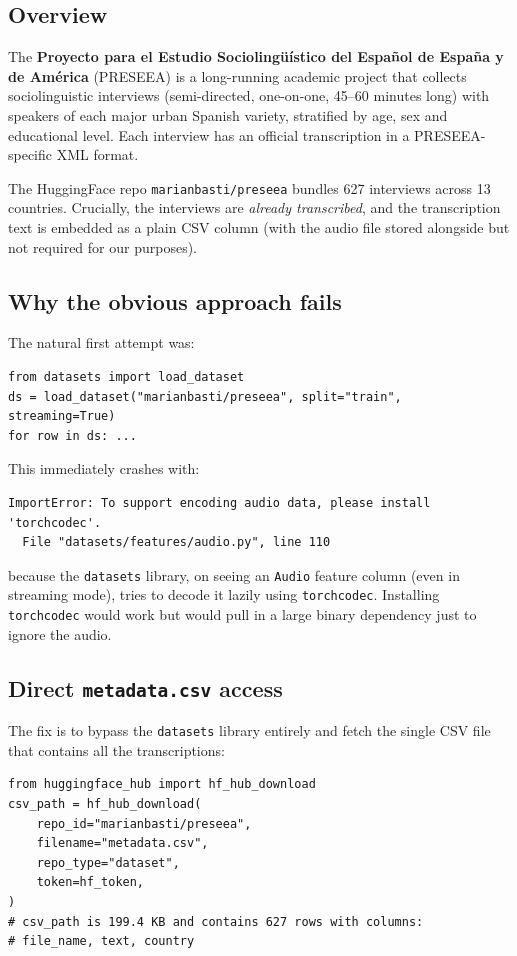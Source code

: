 \documentclass[11pt,a4paper]{article}
\begin{document}
\subsection{Overview}

The \textbf{Proyecto para el Estudio Sociolingüístico del Español de
España y de América} (PRESEEA) is a long-running academic project that
collects sociolinguistic interviews (semi-directed, one-on-one, 45--60
minutes long) with speakers of each major urban Spanish variety, stratified
by age, sex and educational level. Each interview has an official
transcription in a PRESEEA-specific XML format.

The HuggingFace repo \texttt{marianbasti/preseea} bundles 627 interviews
across 13 countries. Crucially, the interviews are \emph{already
transcribed}, and the transcription text is embedded as a plain CSV
column (with the audio file stored alongside but not required for our
purposes).

\subsection{Why the obvious approach fails}

The natural first attempt was:
\begin{lstlisting}[style=pycode]
from datasets import load_dataset
ds = load_dataset("marianbasti/preseea", split="train", streaming=True)
for row in ds: ...
\end{lstlisting}

This immediately crashes with:
\begin{lstlisting}[style=shellcode]
ImportError: To support encoding audio data, please install 'torchcodec'.
  File "datasets/features/audio.py", line 110
\end{lstlisting}
because the \texttt{datasets} library, on seeing an \texttt{Audio} feature
column (even in streaming mode), tries to decode it lazily using
\texttt{torchcodec}. Installing \texttt{torchcodec} would work but would
pull in a large binary dependency just to ignore the audio.

\subsection{Direct \texttt{metadata.csv} access}

The fix is to bypass the \texttt{datasets} library entirely and fetch the
single CSV file that contains all the transcriptions:

\begin{lstlisting}[style=pycode,caption={PRESEEA direct metadata access.}]
from huggingface_hub import hf_hub_download
csv_path = hf_hub_download(
    repo_id="marianbasti/preseea",
    filename="metadata.csv",
    repo_type="dataset",
    token=hf_token,
)
# csv_path is 199.4 KB and contains 627 rows with columns:
# file_name, text, country
\end{lstlisting}
\end{document}
